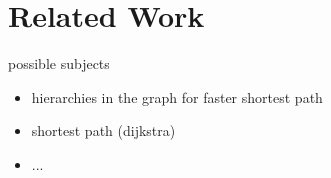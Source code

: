 \section{Related Work}\label{sec:relatedwork}
possible subjects
\begin{itemize}
    \item hierarchies in the graph for faster shortest path
    \item shortest path (dijkstra)
    \item ...
\end{itemize}
